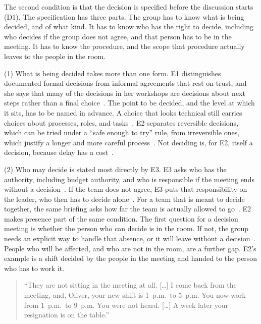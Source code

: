 The second condition is that the decision is specified before the discussion starts (D1).
The specification has three parts.
The group has to know what is being decided, and of what kind.
It has to know who has the right to decide, including who decides if the group does not agree,
and that person has to be in the meeting.
It has to know the procedure, and the scope that procedure actually leaves to the people in
the room.

(1) What is being decided takes more than one form.
E1 distinguishes documented formal decisions from informal agreements that rest on trust, and
she says that many of the decisions in her workshops are decisions about next steps rather
than a final choice~.
The point to be decided, and the level at which it sits, has to be named in advance.
A choice that looks technical still carries choices about processes, roles, and
tasks~.
E2 separates reversible decisions, which can be tried under a ``safe enough to try'' rule,
from irreversible ones, which justify a longer and more careful process~.
Not deciding is, for E2, itself a decision, because delay has a cost~.

(2) Who may decide is stated most directly by E3.
E3 asks who has the authority, including budget authority, and who is responsible if the
meeting ends without a decision~.
If the team does not agree, E3 puts that responsibility on the leader, who then has to decide
alone~.
For a team that is meant to decide together, the same briefing asks how far the team is
actually allowed to go~.
E2 makes presence part of the same condition.
The first question for a decision meeting is whether the person who can decide is in the room.
If not, the group needs an explicit way to handle that absence, or it will leave without a
decision~.
People who will be affected, and who are not in the room, are a further gap.
E2's example is a shift decided by the people in the meeting and handed to the person who has
to work it.
{\setlength{\topsep}{0.25\baselineskip}\setlength{\partopsep}{0pt}%
  \begin{quote}\small
    \enquote{They are not sitting in the meeting at all. [\ldots] I come back from the meeting,
      and, Oliver, your new shift is 1~p.m.\ to 5~p.m. You now work from 1~p.m.\ to 9~p.m.
      You were not heard. [\ldots] A week later your resignation is on the
    table.}~
\end{quote}}

